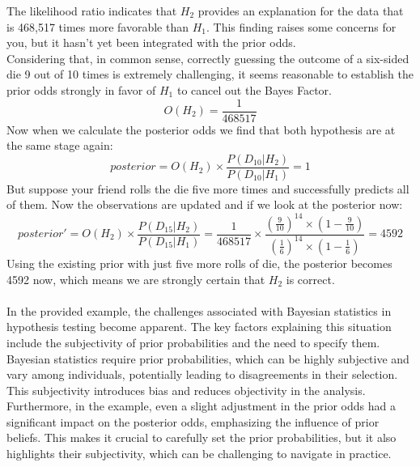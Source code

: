 \documentclass{article}
\begin{document}
The likelihood ratio indicates that $H_2$ provides an explanation for the data that is 468,517 times more favorable than $H_1$. This finding raises some concerns for you, but it hasn't yet been integrated with the prior odds.\\
Considering that, in common sense, correctly guessing the outcome of a six-sided die 9 out of 10 times is extremely challenging, it seems reasonable to establish the prior odds strongly in favor of $H_1$ to cancel out the Bayes Factor.
\[O(H_2)=\frac{1}{468517}\]
Now when we calculate the posterior odds we find that both hypothesis are at the same stage again:
\[posterior=O(H_2)\times\frac{P(D_{10}|H_2)}{P(D_{10}|H_1)}=1\]
But suppose your friend rolls the die five more times and successfully predicts all of them. Now the observations are updated and if we look at the posterior now:
\[posterior'=O(H_2)\times \frac{P(D_{15}|H_2)}{P(D_{15}|H_1)}=\frac{1}{468517}\times \frac{(\frac{9}{10})^{14}\times (1-\frac{9}{10})}{(\frac{1}{6})^{14}\times (1-\frac{1}{6})}=4592\]
Using the existing prior with just five more rolls of die, the posterior becomes 4592 now, which means we are strongly certain that $H_2$ is correct. 
\\\\
In the provided example, the challenges associated with Bayesian statistics in hypothesis testing become apparent. The key factors explaining this situation include the subjectivity of prior probabilities and the need to specify them. Bayesian statistics require prior probabilities, which can be highly subjective and vary among individuals, potentially leading to disagreements in their selection. This subjectivity introduces bias and reduces objectivity in the analysis. Furthermore, in the example, even a slight adjustment in the prior odds had a significant impact on the posterior odds, emphasizing the influence of prior beliefs. This makes it crucial to carefully set the prior probabilities, but it also highlights their subjectivity, which can be challenging to navigate in practice.
\end{document}
